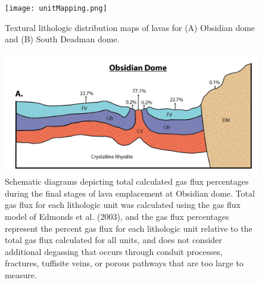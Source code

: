 \documentclass[11pt]{amsart}
\begin{document}
\begin{figure}
   \centering
\texttt{[image: unitMapping.png]}
\caption{Textural lithologic distribution maps of lavas for (A) Obsidian dome and (B) South Deadman dome.}
\label{fig:unitMapping}
\end{figure}

\begin{figure}
   \centering
\includegraphics[scale=0.5]{crossSection.png}
\caption{Schematic diagrams depicting total calculated gas flux percentages during the final stages of lava emplacement at Obsidian dome. Total gas flux for each lithologic unit was calculated using the gas flux model of Edmonds et al. (2003), and the gas flux percentages represent the percent gas flux for each lithologic unit relative to the total gas flux calculated for all units, and does not consider additional degassing that occurs through conduit processes, fractures, tuffisite veins, or porous pathways that are too large to measure.}
\label{fig:crossSection}
\end{figure}
\end{document}
